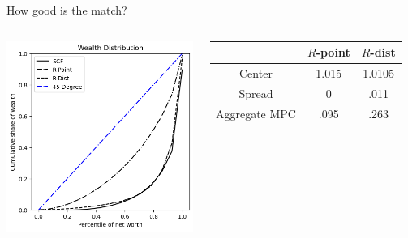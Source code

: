 \documentclass{beamer}
\begin{document}
\begin{frame}{How good is the match?}
    
    \begin{columns}
    \centering
    \includegraphics[width=.9\textwidth]{Figures/hetreturns-PYunif.png}
    
    \hspace{-5mm}
    \centering
    
    \begin{tabular}{|c|c|c|}

\hline
& $R$-point & $R$-dist \\
\hline
Center & 1.015 & 1.0105  \\
Spread & 0  &  .011  \\
Aggregate MPC & .095 &  .263 \\
\hline
\end{tabular}
    
  \end{columns}
    
\end{frame}
\end{document}
